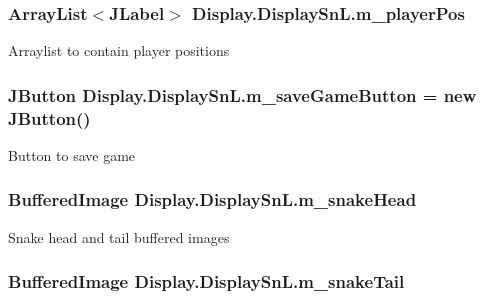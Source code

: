 \subsubsection[{m\+\_\+player\+Pos}]{\setlength{\rightskip}{0pt plus 5cm}Array\+List$<$J\+Label$>$ Display.\+Display\+Sn\+L.\+m\+\_\+player\+Pos\hspace{0.3cm}{\ttfamily [private]}}\label{class_display_1_1_display_sn_l_aa4b30638e1d8f99b5052652ea02d6365}
Arraylist to contain player positions \hypertarget{class_display_1_1_display_sn_l_a7ae26c71761566ba21e8eb4e4981969f}{}
\subsubsection[{m\+\_\+save\+Game\+Button}]{\setlength{\rightskip}{0pt plus 5cm}J\+Button Display.\+Display\+Sn\+L.\+m\+\_\+save\+Game\+Button = new J\+Button()\hspace{0.3cm}{\ttfamily [private]}}\label{class_display_1_1_display_sn_l_a7ae26c71761566ba21e8eb4e4981969f}
Button to save game \hypertarget{class_display_1_1_display_sn_l_ad8119225e6027adeced313ef342b67a2}{}
\subsubsection[{m\+\_\+snake\+Head}]{\setlength{\rightskip}{0pt plus 5cm}Buffered\+Image Display.\+Display\+Sn\+L.\+m\+\_\+snake\+Head\hspace{0.3cm}{\ttfamily [private]}}\label{class_display_1_1_display_sn_l_ad8119225e6027adeced313ef342b67a2}
Snake head and tail buffered images \hypertarget{class_display_1_1_display_sn_l_a6821965beb6bde17ff10f6e3e09f3287}{}
\subsubsection[{m\+\_\+snake\+Tail}]{\setlength{\rightskip}{0pt plus 5cm}Buffered\+Image Display.\+Display\+Sn\+L.\+m\+\_\+snake\+Tail\hspace{0.3cm}{\ttfamily [private]}}\label{class_display_1_1_display_sn_l_a6821965beb6bde17ff10f6e3e09f3287}
\hypertarget{class_display_1_1_display_sn_l_a4e69018d83aaba48baa701597a876bf6}{}

